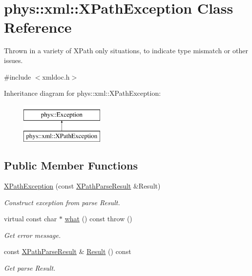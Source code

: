 \hypertarget{classphys_1_1xml_1_1XPathException}{
\section{phys::xml::XPathException Class Reference}
\label{d4/d30/classphys_1_1xml_1_1XPathException}
}


Thrown in a variety of XPath only situations, to indicate type mismatch or other issues.  




{\ttfamily \#include $<$xmldoc.h$>$}

Inheritance diagram for phys::xml::XPathException:\begin{figure}[H]
\begin{center}
\leavevmode
\includegraphics[height=2.000000cm]{d4/d30/classphys_1_1xml_1_1XPathException}
\end{center}
\end{figure}
\subsection*{Public Member Functions}
\begin{DoxyCompactItemize}
\item 
\hypertarget{classphys_1_1xml_1_1XPathException_a39d6511632945aa46b63e80f5364e959}{
\hyperlink{classphys_1_1xml_1_1XPathException_a39d6511632945aa46b63e80f5364e959}{XPathException} (const \hyperlink{structphys_1_1xml_1_1XPathParseResult}{XPathParseResult} \&Result)}
\label{d4/d30/classphys_1_1xml_1_1XPathException_a39d6511632945aa46b63e80f5364e959}

\begin{DoxyCompactList}\small\item\em Construct exception from parse Result. \item\end{DoxyCompactList}\item 
virtual const char $\ast$ \hyperlink{classphys_1_1xml_1_1XPathException_ab16319369cd5f40990300b1b22b8f6cb}{what} () const   throw ()
\begin{DoxyCompactList}\small\item\em Get error message. \item\end{DoxyCompactList}\item 
const \hyperlink{structphys_1_1xml_1_1XPathParseResult}{XPathParseResult} \& \hyperlink{classphys_1_1xml_1_1XPathException_a5410a12f705cbbc006175c08872b5749}{Result} () const 
\begin{DoxyCompactList}\small\item\em Get parse Result. \item\end{DoxyCompactList}\end{DoxyCompactItemize}



